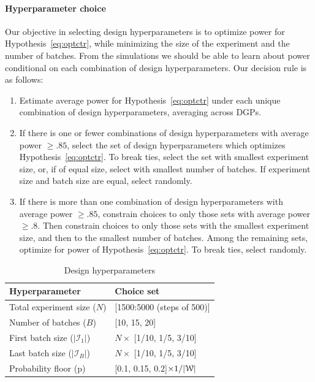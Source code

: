 \documentclass[letterpaper, 12pt, parskip=full,]{scrartcl}
\begin{document}
\paragraph{Hyperparameter choice}
Our objective in selecting design hyperparameters is to optimize power for Hypothesis~\ref{eq:optctr}, while minimizing the size of the experiment and the number of batches. From the simulations we should be able to learn about power conditional on each combination of design hyperparameters. Our decision rule is as follows:
\begin{enumerate}
\item Estimate average power for Hypothesis~\ref{eq:optctr} under each unique combination of design hyperparameters, averaging across DGPs. 
\item If there is one or fewer combinations of design hyperparameters with average power $\ge.85$, select the set of design hyperparameters which optimizes Hypothesis~\ref{eq:optctr}. To break ties, select the set with smallest experiment size, or, if of equal size, select with smallest number of batches. If experiment size and batch size are equal, select randomly. 
\item If there is more than one combination of design hyperparameters with average power $\ge.85$, constrain choices to only those sets with average power $\ge.8$. Then constrain choices to only those sets with the smallest experiment size, and then to the smallest number of batches. Among the remaining sets, optimize for power of Hypothesis~\ref{eq:optctr}. To break ties, select randomly. 
\end{enumerate}

\begin{table}[H]
\centering
\caption{Design hyperparameters} 
\label{tab:design}
\begin{tabular}{l | l}
\textbf{Hyperparameter} & \textbf{Choice set} \\ \hline
Total experiment size ($N$)& [1500:5000 (steps of 500)] \\
Number of batches ($B$)& [10, 15, 20] \\
First batch size ($|\mathcal{I}_1|$) & $N \times$ [1/10, 1/5, 3/10] \\
Last batch size ($|\mathcal{I}_B|$) &  $N \times$ [1/10, 1/5, 3/10] \\
Probability floor (p)& [0.1, 0.15, 0.2]$\times 1/ |{\EuScript W}|$ \\
\hline
\end{tabular}
\end{table}
\end{document}
